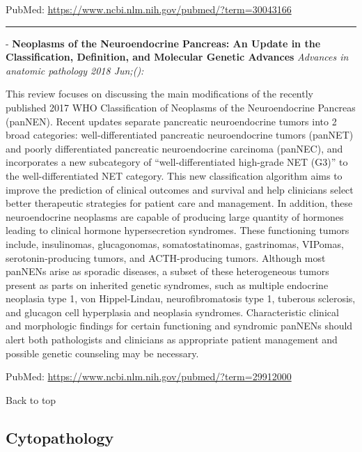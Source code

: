 \documentclass[]{article}
\begin{document}
PubMed: \url{https://www.ncbi.nlm.nih.gov/pubmed/?term=30043166}

{}

{}

\begin{center}\rule{0.5\linewidth}{\linethickness}\end{center}

 - \textbf{Neoplasms of the Neuroendocrine Pancreas: An Update in the
Classification, Definition, and Molecular Genetic Advances}
\emph{Advances in anatomic pathology 2018 Jun;():}

This review focuses on discussing the main modifications of the recently
published 2017 WHO Classification of Neoplasms of the Neuroendocrine
Pancreas (panNEN). Recent updates separate pancreatic neuroendocrine
tumors into 2 broad categories: well-differentiated pancreatic
neuroendocrine tumors (panNET) and poorly differentiated pancreatic
neuroendocrine carcinoma (panNEC), and incorporates a new subcategory of
``well-differentiated high-grade NET (G3)'' to the well-differentiated
NET category. This new classification algorithm aims to improve the
prediction of clinical outcomes and survival and help clinicians select
better therapeutic strategies for patient care and management. In
addition, these neuroendocrine neoplasms are capable of producing large
quantity of hormones leading to clinical hormone hypersecretion
syndromes. These functioning tumors include, insulinomas, glucagonomas,
somatostatinomas, gastrinomas, VIPomas, serotonin-producing tumors, and
ACTH-producing tumors. Although most panNENs arise as sporadic diseases,
a subset of these heterogeneous tumors present as parts on inherited
genetic syndromes, such as multiple endocrine neoplasia type 1, von
Hippel-Lindau, neurofibromatosis type 1, tuberous sclerosis, and
glucagon cell hyperplasia and neoplasia syndromes. Characteristic
clinical and morphologic findings for certain functioning and syndromic
panNENs should alert both pathologists and clinicians as appropriate
patient management and possible genetic counseling may be necessary.

PubMed: \url{https://www.ncbi.nlm.nih.gov/pubmed/?term=29912000}

{}

{}

Back to top

\pagebreak

\hypertarget{cytopathology}{%
\subsection{Cytopathology}\label{cytopathology}}
\end{document}
